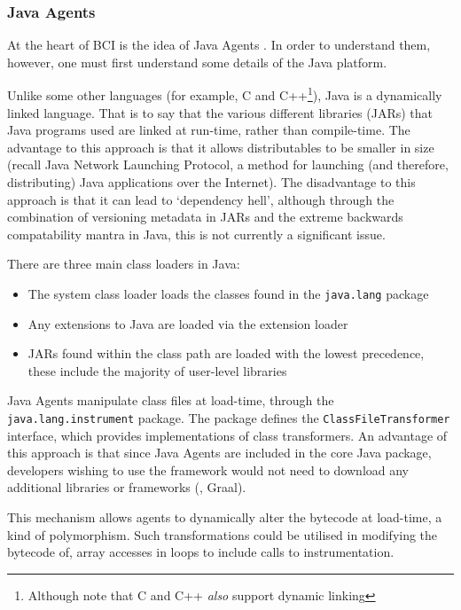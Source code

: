 	\subsubsection{Java Agents} \label{sec:instrumentation/bytecode-instr/agents}
	At the heart of BCI is the idea of Java Agents \citep{javaagents}. In order to understand them, however, one must first understand some details of the Java platform.

	Unlike some other languages (for example, C and C++\footnote{Although note that C and C++ \emph{also} support dynamic linking}), Java is a dynamically linked language. That is to say that the various different libraries (JARs) that Java programs used are linked at run-time, rather than compile-time. The advantage to this approach is that it allows distributables to be smaller in size (recall Java Network Launching Protocol, a method for launching (and therefore, distributing) Java applications over the Internet). The disadvantage to this approach is that it can lead to `dependency hell', although through the combination of versioning metadata in JARs and the extreme backwards compatability mantra in Java, this is not currently a significant issue.

	There are three main class loaders in Java:

	\begin{itemize}
		\item The system class loader loads the classes found in the \texttt{java.lang} package
		
		\item Any extensions to Java are loaded via the extension loader

		\item JARs found within the class path are loaded with the lowest precedence, these include the majority of user-level libraries
	\end{itemize}

	Java Agents manipulate class files at load-time, through the \texttt{java.lang.instrument} package. The package defines the \texttt{ClassFileTransformer} interface, which provides implementations of class transformers. An advantage of this approach is that since Java Agents are included in the core Java package, developers wishing to use the framework would not need to download any additional libraries or frameworks (\ie, Graal).
	
	This mechanism allows agents to dynamically alter the bytecode at load-time, a kind of polymorphism. Such transformations could be utilised in modifying the bytecode of, \eg array accesses in loops to include calls to instrumentation.

